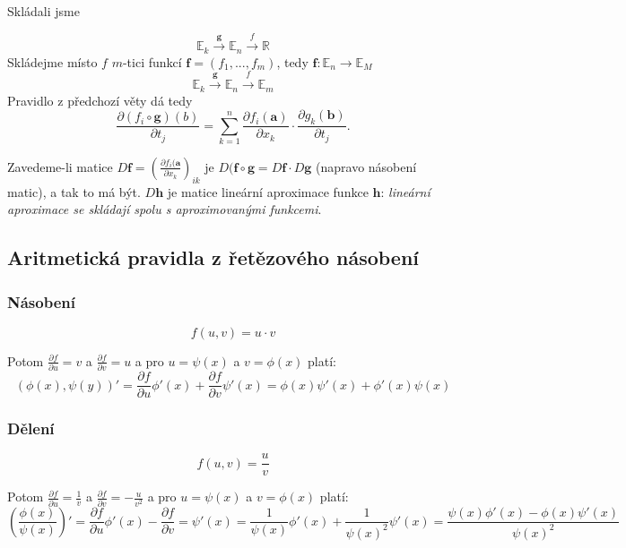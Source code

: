 \documentclass[../main.tex]{subfiles}
\begin{document}
Skládali jsme

\[\mathbb{E}_k \xrightarrow{\mathbf{g}} \mathbb{E}_n \xrightarrow{\textit{f}} \mathbb{R} \]
Skládejme místo $f$ $m$-tici funkcí
$\mathbf{f} = (f_1,...,f_m)$, tedy $\mathbf{f}: \mathbb{E}_n \rightarrow \mathbb{E}_M$
\[\mathbb{E}_k \xrightarrow{\mathbf{g}} \mathbb{E}_n \xrightarrow{\textit{f}} \mathbb{E}_m \]
Pravidlo z předchozí věty dá tedy
\[\frac{\partial (f_i \circ \mathbf{g})(b)}{\partial t_j} = \sum^n_{k=1} \frac{\partial f_i(\mathbf{a})}{\partial x_k}
\cdot \frac{\partial g_k(\mathbf{b})}{\partial t_j}.\]

Zavedeme-li matice $D\mathbf{f} = \left(\frac{\partial f_i(\mathbf{a}}{\partial x_k}\right)_{ik}$ je 
$D(\mathbf{f}\circ \mathbf{g} = D\mathbf{f}\cdot D\mathbf{g}$ (napravo násobení matic), a tak to má být. $D\mathbf{h}$ je matice lineární aproximace 
funkce $\mathbf{h}$: \textit{lineární aproximace se skládají spolu s aproximovanými funkcemi}.
\noindent

\subsection{Aritmetická pravidla z řetězového násobení}
\subsubsection{Násobení}
\[ f(u,v) = u \cdot v \]

\hspace{1.2mm}
\noindent
Potom $ \frac{\partial f}{\partial u} = v $ a $ \frac{\partial f}{\partial v} = u $
a pro $u = \psi (x)$ a $ v = \phi (x) $ platí:
\[ (\phi (x), \psi (y))' =
\frac{\partial f}{\partial u} \phi '(x) + \frac{\partial f}{\partial v} \psi '(x) = 
\phi (x)\psi '(x) + \phi '(x)\psi (x)  \]

\subsubsection{Dělení}
\[ f(u,v) = \frac{u}{v} \]

\hspace{1.2mm}
\noindent
Potom $ \frac{\partial f}{\partial u} = \frac{1}{v} $ a $ \frac{\partial f}{\partial v} = -\frac{u}{v^2} $
a pro $u = \psi (x)$ a $ v = \phi (x) $ platí:
\[ \left( \frac{\phi (x)}{\psi (x)} \right)' =
\frac{\partial f}{\partial u} \phi '(x) - \frac{\partial f}{\partial v} = \psi '(x) =
\frac{1}{\psi (x)} \phi '(x) + \frac{1}{\psi (x)^2}\psi '(x) =
\frac{\psi (x)\phi '(x) - \phi (x)\psi '(x)}{\psi (x)^2} \]
\end{document}
